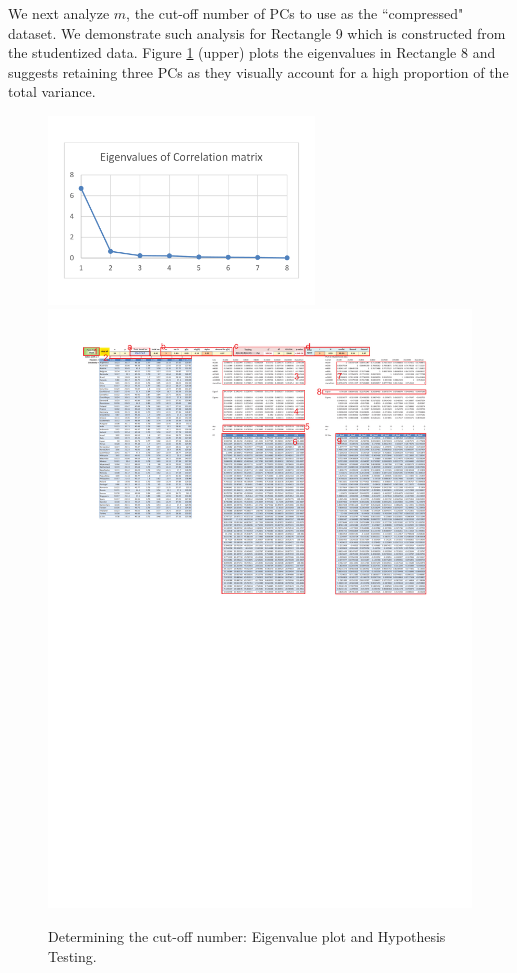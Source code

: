 \documentclass[article]{jss}
\numberwithin{equation}{subsection}
\begin{document}
        We next analyze $m$, the cut-off number of PCs to use as the ``compressed" dataset. We demonstrate such analysis for Rectangle 9 which is constructed from the studentized data. Figure \ref{fig:Determining the cut-off number} (upper) plots the eigenvalues in Rectangle 8 and suggests retaining three PCs as they visually account for a high proportion of the total variance.    
        \begin{figure}[!tbh]
                \vspace{-20pt}\includegraphics[width=200pt, keepaspectratio=true]{img/PCASheetEigenvaluesCorrelPlot}
                \includegraphics[width=\linewidth, keepaspectratio=true]{img/PCASheetComputed_Hypotheses_markup}
                \vspace{-20pt}\centering{}\protect\caption{Determining the cut-off number: Eigenvalue plot and Hypothesis Testing.}\label{fig:Determining the cut-off number}
        \end{figure}
\end{document}
